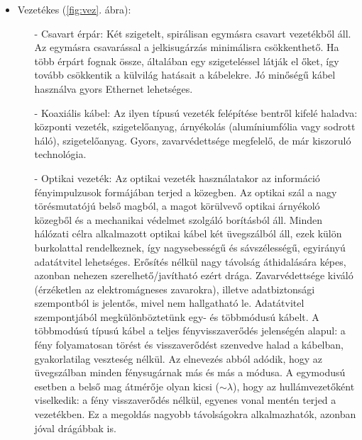 \documentclass[12pt]{article}
\theoremstyle{plain}
\begin{document}
\begin{itemize}
\item Vezetékes (\ref{fig:vez}. ábra):
\begin{itemize}
\item[-] Csavart érpár: Két szigetelt, spirálisan egymásra csavart vezetékből áll. Az egymásra csavarással a jelkisugárzás minimálisra csökkenthető. Ha több érpárt fognak össze, általában egy szigeteléssel látják el őket, így tovább csökkentik a külvilág hatásait a kábelekre. Jó minőségű kábel használva gyors Ethernet lehetséges.
\item[-] Koaxiális kábel: Az ilyen típusú vezeték felépítése bentről kifelé haladva: központi vezeték, szigetelőanyag, árnyékolás (alumíniumfólia vagy sodrott háló), szigetelőanyag. Gyors, zavarvédettsége megfelelő, de már kiszoruló technológia.
\item[-] Optikai vezeték: Az optikai vezeték használatakor az információ fényimpulzusok formájában terjed a közegben. Az optikai szál a nagy törésmutatójú belső magból, a magot körülvevő optikai árnyékoló közegből és a mechanikai védelmet szolgáló borításból áll. Minden hálózati célra alkalmazott optikai kábel két üvegszálból áll, ezek külön burkolattal rendelkeznek, így nagysebességű és sávszélességű, egyirányú adatátvitel lehetséges. Erősítés nélkül nagy távolság áthidalására képes, azonban nehezen szerelhető/javítható ezért drága. Zavarvédettsége kiváló (érzéketlen az elektromágneses zavarokra), illetve adatbiztonsági szempontból is jelentős, mivel nem hallgatható le. Adatátvitel szempontjából megkülönböztetünk egy- és többmódusú kábelt. A többmodúsú típusú kábel a teljes fényvisszaverődés jelenségén alapul: a fény folyamatosan törést és visszaverődést szenvedve halad a kábelban, gyakorlatilag veszteség nélkül. Az elnevezés abból adódik, hogy az üvegszálban minden fénysugárnak más és más a módusa. A egymodusú esetben a belső mag átmérője olyan kicsi ($\sim \lambda$), hogy az hullámvezetőként viselkedik: a fény visszaverődés nélkül, egyenes vonal mentén terjed a vezetékben. Ez a megoldás nagyobb távolságokra alkalmazhatók, azonban jóval drágábbak is.  
\end{itemize}


\end{itemize}
\end{document}
